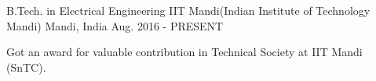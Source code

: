 


\begin{cventries}


\cventry
{B.Tech. in Electrical Engineering} %
{IIT Mandi(Indian Institute of Technology Mandi)} %
{Mandi, India} %
{Aug. 2016 - PRESENT} %
{ %
\begin{cvitems}
\item {Got an award for valuable contribution in Technical Society at IIT Mandi (SnTC).}
\end{cvitems}
}


\end{cventries}